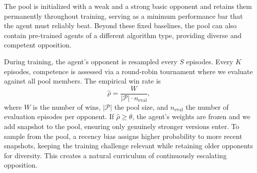 The pool is initialized with a weak and a strong basic opponent and retains them permanently 
throughout training, serving as a minimum performance bar that the agent must reliably beat. 
Beyond these fixed baselines, the pool can also contain pre-trained agents of a different 
algorithm type, providing diverse and competent opposition.

\medskip
During training, the agent's opponent is resampled every $S$ episodes. Every $K$ episodes, 
competence is assessed via a round-robin tournament where we \textcolor{bordergreen}{evaluate against} 
all pool members. The empirical win rate is
\begin{equation}
    \hat{\rho} = \frac{W}{|\mathcal{P}| \cdot n_{\text{eval}}},
\end{equation}
where $W$ is the number of wins, $|\mathcal{P}|$ the pool size, and $n_{\text{eval}}$ the 
number of evaluation episodes per opponent. If $\hat{\rho} \geq \theta$, the agent's weights 
are frozen and we \textcolor{borderyellow}{add snapshot} to the pool, ensuring only genuinely 
stronger versions enter. To \textcolor{borderblue}{sample} from the pool, a recency bias assigns 
higher probability to more recent snapshots, keeping the training challenge relevant while 
retaining older opponents for diversity. This creates a natural curriculum of continuously 
escalating opposition.

